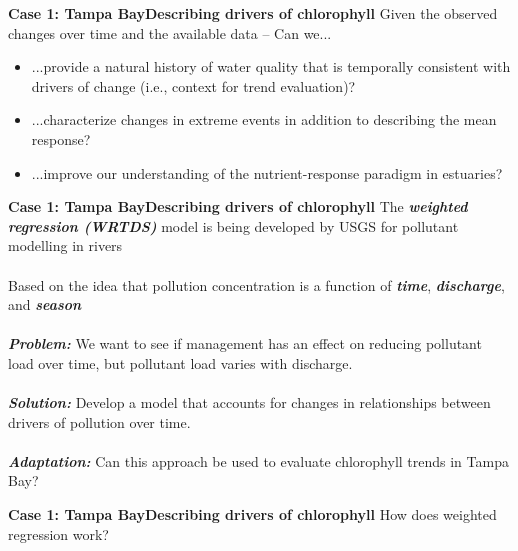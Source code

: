 \documentclass[serif]{beamer}\usepackage[]{graphicx}\usepackage[]{color}
\newcommand{\emtxt}[1]{\textbf{\textit{#1}}}
\begin{document}
\begin{frame}{\textbf{Case 1: Tampa Bay}}{\textbf{Describing drivers of chlorophyll}}
Given the observed changes over time and the available data -- Can we... 
\begin{itemize}
\item ...provide a natural history of water quality that is temporally consistent with drivers of change (i.e., context for trend evaluation)?
\item ...characterize changes in extreme events in addition to describing the mean response?  
\item ...improve our understanding of the nutrient-response paradigm in estuaries?
\end{itemize}
\end{frame}

\begin{frame}{\textbf{Case 1: Tampa Bay}}{\textbf{Describing drivers of chlorophyll}}
The \emtxt{weighted regression (WRTDS)} model is being developed by USGS for pollutant modelling in rivers \cite{Hirsch10}\\~\\
Based on the idea that pollution concentration is a function of \emtxt{time}, \emtxt{discharge}, and \emtxt{season}\\~\\
\emtxt{Problem:} We want to see if management has an effect on reducing pollutant load over time, but pollutant load varies with discharge.\\~\\
\emtxt{Solution:} Develop a model that accounts for changes in relationships between drivers of pollution over time.\\~\\
\emtxt{Adaptation:} Can this approach be used to evaluate chlorophyll trends in Tampa Bay?
\end{frame}



\begin{frame}{\textbf{Case 1: Tampa Bay}}{\textbf{Describing drivers of chlorophyll}}
How does weighted regression work?
\begin{center}
\end{center}
\end{frame}
\end{document}
